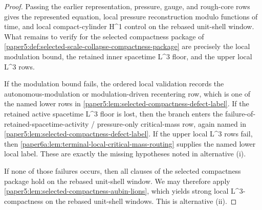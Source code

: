 \documentclass[11pt]{amsart}
\def\({}%
\def\){}%
\theoremstyle{plain}
\theoremstyle{definition}
\theoremstyle{remark}
\begin{document}
\begin{proof}
Passing the earlier representation, pressure, gauge, and rough-core rows gives
the represented equation, local pressure reconstruction modulo functions of
time, and local compact-cylinder \(H^1\) control on the rebased unit-shell
window.  What remains to verify for the selected compactness package of
\cref{paper5:def:selected-scale-collapse-compactness-package} are precisely the
local modulation bound, the retained inner spacetime \(L^3\) floor, and the upper
local \(L^3\) rows.

If the modulation bound fails, the ordered local validation records the
autonomous-modulation or modulation-driven recentering row, which is one of the
named lower rows in
\cref{paper5:lem:selected-compactness-defect-label}.  If the retained active
spacetime \(L^3\) floor is lost, then the branch enters the failure-of-retained-spacetime-activity / pressure-only
critical-mass row, again named in
\cref{paper5:lem:selected-compactness-defect-label}.  If the upper local
\(L^3\) rows fail, then
\cref{paper6a:lem:terminal-local-critical-mass-routing} supplies the named lower
local label.  These are exactly the missing hypotheses noted in
alternative \textup{(i)}.

If none of those failures occurs, then all clauses of the selected compactness
package hold on the rebased unit-shell window.  We may therefore apply
\cref{paper5:lem:selected-compactness-aubin-lions}, which yields strong local
\(L^3\)-compactness on the rebased unit-shell windows.  This is
alternative \textup{(ii)}.
\end{proof}
\end{document}
